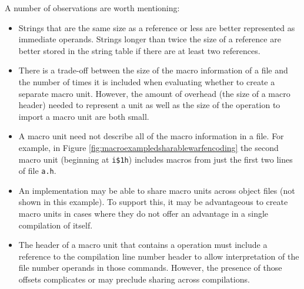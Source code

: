 A number of observations are worth mentioning:
\begin{itemize}
\item
Strings that are the same size as a reference or less are
better represented as immediate operands. Strings longer
than twice the size of a reference are better stored in the
string table if there are at least two references.

\item
There is a trade-off between the size of the macro information
of a file and the number of times it is included when evaluating
whether to create a separate macro unit. However, the amount
of overhead (the size of a macro header) needed to represent a
unit as well as the size of the operation to import a macro unit
are both small.

\item
A macro unit need not describe all of the macro information in
a file. For example, in Figure \ref{fig:macroexampledsharablewarfencoding}
the second macro unit (beginning at \texttt{i\$1h}) includes macros
from just the first two lines of file \texttt{a.h}.

\item
An implementation may be able to share macro units across object
files (not shown in this example). To support this, it may be
advantageous to create macro units in cases where they do not
offer an advantage in a single compilation of itself.

\item
The header of a macro unit that contains a \DWMACROstartfile{}
operation must include a reference to the compilation line number 
header to allow interpretation of the file number operands in
those commands. However, the presence of those offsets complicates
or may preclude sharing across compilations.

\end{itemize}